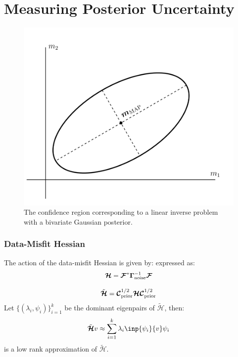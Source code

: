 \documentclass[
  pdf,
  10pt,
  xcolor={svgnames},
]{beamer}
\newcommand{\mcb}[1]{\boldsymbol{\mathcal{#1}}}
\newcommand{\mat}[1]{\mathbf{{#1}}}
\begin{document}
\section{Measuring Posterior Uncertainty}
\begin{frame}
  \begin{figure}
    \centering
    \includegraphics[width=.65\textwidth]{./resources/bivariate}
    \caption{
      The confidence region corresponding to a linear inverse problem with a
      bivariate Gaussian posterior.
    }
  \end{figure}
\end{frame}

\begin{frame}
  \frametitle{Data-Misfit Hessian}
  \begin{definition}
    The action of the data-misfit Hessian is given by:
    expressed as:
    \begin{equation*}
      \mcb{H} = \mcb{F}^* \mat{\Gamma}_{\rm noise}^{-1} \mcb{F}
    \end{equation*}
  \end{definition}
  \pause
  \begin{definition}
    \begin{equation*}
      \tilde{\mcb{H}}
      = \mcb{C}_{\rm prior}^{1/2} \mcb{H} \mcb{C}_{\rm prior}^{1/2}
    \end{equation*}
    Let $\{(\lambda_i, \psi_i)\}_{i=1}^k$ be the dominant eigenpairs of
    $\tilde{\mcb{H}}$, then:
    \[
      \tilde{\mcb{H}} v \approx \sum_{i=1}^k \lambda_i \inp{\psi_i}{v} \psi_i
    \]
    is a low rank approximation of $\tilde{\mcb{H}}$.
  \end{definition}
\end{frame}
\end{document}
